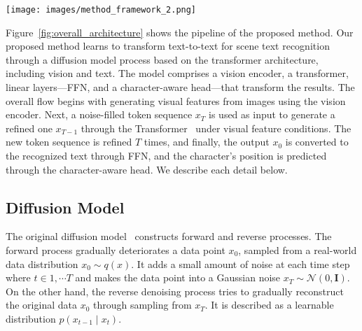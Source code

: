 \documentclass{article}
\begin{document}
\begin{figure*}[htp]
	\centering
	\texttt{[image: images/method\_framework\_2.png]}
	\caption{
\textbf{The pipeline of the proposed scene text recognition using a diffusion model.}
It consists of the vision encoder~\cite{dosovitskiy2020vit}, Transformer~\cite{vaswani2017transformer} with an additional time-based positional encoding, FFN and character-aware head.
\texttt{[E]} and \texttt{[P]} are abbreviations for special tokens \texttt{[EOS]} and \texttt{[PAD]}, respectively.
The proposed method performs text recognition by repeatedly refining the input sequence $x_{t}$ based on image information.
FFN performs character classification, while the character-aware head predicts where a character exists in a fixed-length sequence.
	}
	\label{fig:overall_architecture}
    \vspace*{-1.00\baselineskip}
\end{figure*}

Figure~\ref{fig:overall_architecture} shows the pipeline of the proposed method.
Our proposed method learns to transform text-to-text for scene text recognition through a diffusion model process based on the transformer architecture, including vision and text.
The model comprises a vision encoder, a transformer, linear layers---FFN, and a character-aware head---that transform the results.
The overall flow begins with generating visual features from images using the vision encoder.
Next, a noise-filled token sequence $x_{T}$ is used as input to generate a refined one $x_{T-1}$ through the Transformer~\cite{vaswani2017transformer} under visual feature conditions.
The new token sequence is refined $T$ times, and finally, the output $x_{0}$ is converted to the recognized text through FFN, and the character's position is predicted through the character-aware head.
We describe each detail below.


\subsection{Diffusion Model}
The original diffusion model~\cite{sohl2015diffusionmodel} constructs forward and reverse processes.
The forward process gradually deteriorates a data point $x_{0}$, sampled from a real-world data distribution $x_{0} \sim q(x)$.
It adds a small amount of noise at each time step where $t \in 1, \cdots T$ and makes the data point into a Gaussian noise $x_{T} \sim \mathcal{N}(0, \mathbf{I})$.
On the other hand, the reverse denoising process tries to gradually reconstruct the original data $x_{0}$ through sampling from $x_{T}$.
It is described as a learnable distribution $p(x_{t-1} \mid x_{t})$. 
\end{document}
